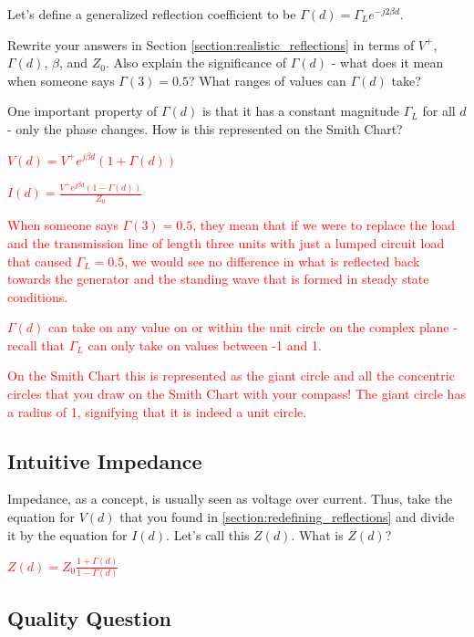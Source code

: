 \documentclass{article}
\begin{document}
Let's define a generalized reflection coefficient to be $\Gamma(d) = \Gamma_L e^{-j2 \beta d}$.

Rewrite your answers in Section \ref{section:realistic_reflections} in terms of $V^+$, $\Gamma(d)$, $\beta$, and $Z_0$. Also explain the significance of $\Gamma(d)$ - what does it mean when someone says $\Gamma(3) = 0.5$? What ranges of values can $\Gamma(d)$ take?

One important property of $\Gamma(d)$ is that it has a constant magnitude $\Gamma_L$ for all $d$ - only the phase changes. How is this represented on the Smith Chart?

\textcolor{red}{$V(d) = V^+ e^{j\beta d}(1 + \Gamma(d))$}

\textcolor{red}{$I(d) = \frac{V^+ e^{j\beta d}(1 - \Gamma(d))}{Z_0}$}

\textcolor{red}{When someone says $\Gamma(3) = 0.5$, they mean that if we were to replace the load and the transmission line of length three units with just a lumped circuit load that caused $\Gamma_L = 0.5$, we would see no difference in what is reflected back towards the generator and the standing wave that is formed in steady state conditions.}

\textcolor{red}{$\Gamma(d)$ can take on any value on or within the unit circle on the complex plane - recall that $\Gamma_L$ can only take on values between -1 and 1.}

\textcolor{red}{On the Smith Chart this is represented as the giant circle and all the concentric circles that you draw on the Smith Chart with your compass! The giant circle has a radius of 1, signifying that it is indeed a unit circle.}

\vfill
\newpage

\subsection{Intuitive Impedance}

Impedance, as a concept, is usually seen as voltage over current. Thus, take the equation for $V(d)$ that you found in \ref{section:redefining_reflections} and divide it by the equation for $I(d)$. Let's call this $Z(d)$. What is $Z(d)$?

\textcolor{red}{$Z(d) = Z_0 \frac{1 + \Gamma(d)}{1 - \Gamma(d)}$}

\vfill

\subsection{Quality Question}
\end{document}
